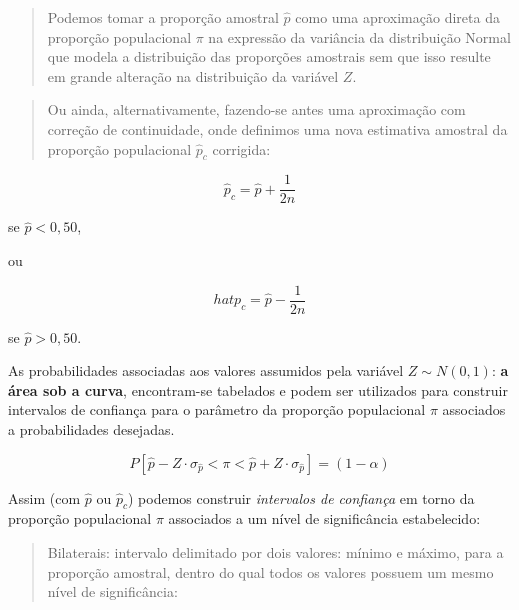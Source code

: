 \documentclass[
]{book}
\begin{document}
\hfill\break

\begin{quote}
Podemos tomar a proporção amostral \(\hat{p}\) como uma aproximação direta da proporção populacional \(\pi\) na expressão da variância da distribuição Normal que modela a distribuição das proporções amostrais sem que isso resulte em grande alteração na distribuição da variável \(Z\).
\end{quote}

\hfill\break

\begin{quote}
Ou ainda, alternativamente, fazendo-se antes uma aproximação com correção de continuidade, onde definimos uma nova estimativa amostral da proporção populacional \(\hat{p}_{c}\) corrigida:
\end{quote}

\[
\hat{p}_{c} = \hat{p}+\frac{1}{2n}
\]

\hfill\break

se \(\hat{p} < 0,50\),

ou

\hfill\break

\[
hat{p}_{c} = \hat{p}- \frac{1}{2n}
\]

\hfill\break

se \(\hat{p} > 0,50\).

\hfill\break

As probabilidades associadas aos valores assumidos pela variável \(Z \sim N\left(0,1\right)\): \textbf{a área sob a curva}, encontram-se tabelados e podem ser utilizados para construir intervalos de confiança para o parâmetro da proporção populacional \(\pi\) associados a probabilidades desejadas.

\hfill\break

\[
P [ \hat{p} - Z \cdot  {\sigma }_{\hat{p}}   < \pi < \hat{p} + Z \cdot  {\sigma }_{\hat{p}} ] = (1-\alpha)
\]

\hfill\break

Assim (com \(\hat{p}\) ou \(\hat{p}_{c}\)) podemos construir \emph{intervalos de confiança} em torno da proporção populacional \(\pi\) associados a um nível de significância estabelecido:

\hfill\break

\begin{quote}
Bilaterais: intervalo delimitado por dois valores: mínimo e máximo, para a proporção amostral, dentro do qual todos os valores possuem um mesmo nível de significância:
\end{quote}
\end{document}
